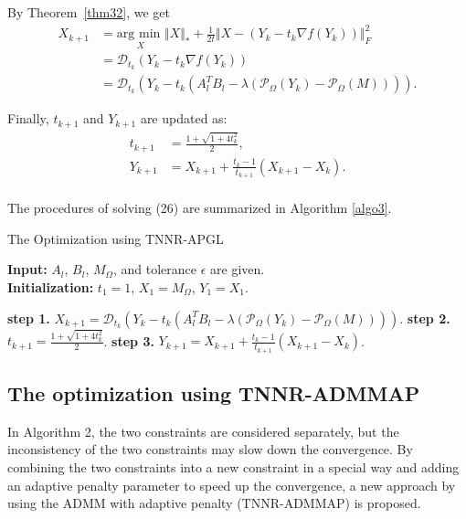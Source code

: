 \documentclass{article}
\begin{document}
{By Theorem~\ref{thm32}, we get
\begin{equation}
	\begin{aligned}
		X_{k+1} & = \underset{X}{\text{arg min }} \Vert X\Vert_* + \frac{1}{2t}\Vert X- (Y_k -t_k \nabla f(Y_k))\Vert_F^2 \\
		& = \mathcal{D}_{t_k}(Y_k - t_k\nabla f(Y_k)) \\
		& = \mathcal{D}_{t_k}(Y_k - t_k(A_l^TB_l - \lambda(\mathcal{P}_{\Omega}(Y_k)- \mathcal{P}_{\Omega}(M)))).
	\end{aligned}
\end{equation}

Finally, $t_{k+1}$ and $Y_{k+1}$ are updated as:
\begin{equation}
	\begin{aligned}
		t_{k+1} & = \frac{1+\sqrt{1+4t^2_k}}{2}, \\
		Y_{k+1}& = X_{k+1} +\frac{t_{k}-1}{t_{k+1}}(X_{k+1}-X_{k}). \\
	\end{aligned}
\end{equation}

The procedures of solving (26) are summarized in Algorithm \ref{algo3}.

\begin{algorithm}[t]
	\caption{The Optimization using TNNR-APGL}
	\label{algo3}
	\textbf{Input:} $A_l$, $B_l$, $M_{\Omega}$, and tolerance $\epsilon$ are given.\\
	\textbf{Initialization:} $t_1 = 1$, $X_1 = M_{\Omega}$, $Y_1=X_1$.
	\begin{algorithmic}
		\Repeat 
		\State \textbf{step 1.} $X_{k+1} = \mathcal{D}_{t_k}(Y_k - t_k(A_l^TB_l - \lambda(\mathcal{P}_{\Omega}(Y_k)- \mathcal{P}_{\Omega}(M))))$.
		\State \textbf{step 2.} $t_{k+1} = \frac{1+\sqrt{1+4t^2_k}}{2}$.
		\State \textbf{step 3.} $Y_{k+1} = X_{k+1} +\frac{t_{k}-1}{t_{k+1}}(X_{k+1}-X_{k})$.
	\end{algorithmic}
\end{algorithm}


\subsection{The optimization using TNNR-ADMMAP}
In Algorithm 2, the two constraints are considered separately, but the inconsistency of the two constraints may slow down the convergence.
By combining the two constraints into a new constraint in a special way and adding an adaptive penalty parameter to speed up the convergence,  a new approach by using the ADMM with adaptive penalty (TNNR-ADMMAP) is proposed.
}
\end{document}
